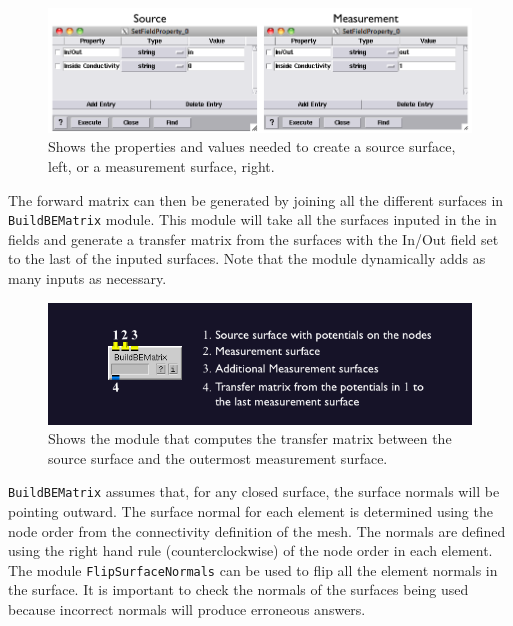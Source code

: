 \documentclass[fleqn,11pt,openany]{book}
\begin{document}
\begin{figure}[H]
\begin{center}
\includegraphics[width=\textwidth]{ECGToolkitGuide_figures/SetFieldPropGUI.png}
\caption{Shows the properties and values needed to create a source surface, left, or a
measurement surface, right.}
\label{SetFieldPropGUI}
\end{center}
\end{figure}


The forward matrix can then be generated by joining all the different surfaces in {\tt BuildBEMatrix} module.
This module will take all the surfaces inputed in the in fields and generate a transfer matrix from the surfaces with the
In/Out field set to the last of the inputed surfaces. Note that the module dynamically adds as many inputs as necessary.

\begin{figure}[H]
\begin{center}
\includegraphics[width=\textwidth]{ECGToolkitGuide_figures/BEMmod.png}
\caption{Shows the module that computes the transfer matrix between the source surface
and the outermost measurement surface.}
\label{BEM}
\end{center}
\end{figure}

{\tt BuildBEMatrix} assumes that, for any closed surface, the surface normals will be pointing outward. The surface
normal for each element is determined using the node order from the connectivity definition of the mesh. The
normals are defined using the right hand rule (counterclockwise) of the node order in each element. The
module {\tt FlipSurfaceNormals} can be used to flip all the element normals in the surface. It is important to check
the normals of the surfaces being used because incorrect normals will produce erroneous answers.
\end{document}
